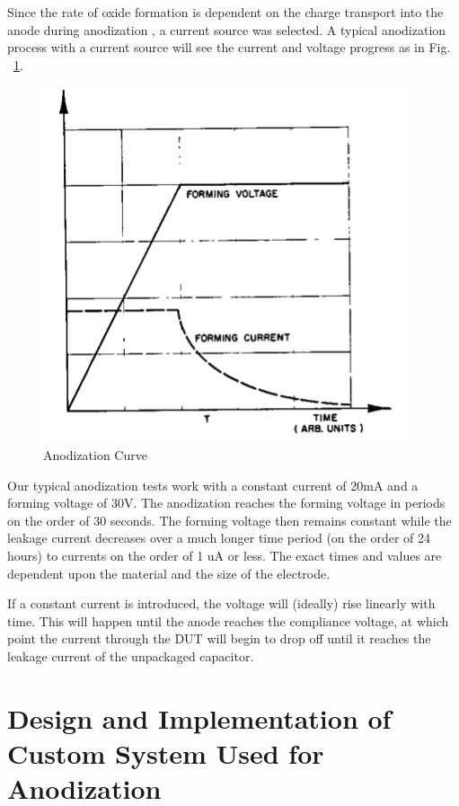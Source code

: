 \documentclass[journal]{IEEEtran}
\begin{document}
Since the rate of oxide formation is dependent on the charge transport into the anode during anodization \cite{tiMinit}, a current source was selected. A typical anodization process with a current source will see the current and voltage progress as in Fig. ~\ref{fig:anodCurve}.


\begin{figure}[here]
\centering
\includegraphics{anodCurve}
\caption{Anodization Curve \cite{tiMinit}}
\label{fig:anodCurve}
\end{figure}

Our typical anodization tests work with a constant current of 20mA and a forming voltage of 30V. The anodization reaches the forming voltage in periods on the order of 30 seconds. The forming voltage then remains constant while the leakage current decreases over  a much longer time period (on the order of 24 hours) to currents on the order of 1 uA or less. The exact times and values are dependent upon the material and the size of the electrode.

If a constant current is introduced, the voltage will (ideally) rise linearly with time. This will happen until the anode reaches the compliance voltage, at which point the current through the DUT will begin to drop off until it reaches the leakage current of the unpackaged capacitor. 

\section{Design and Implementation of Custom System Used for Anodization}
\end{document}
